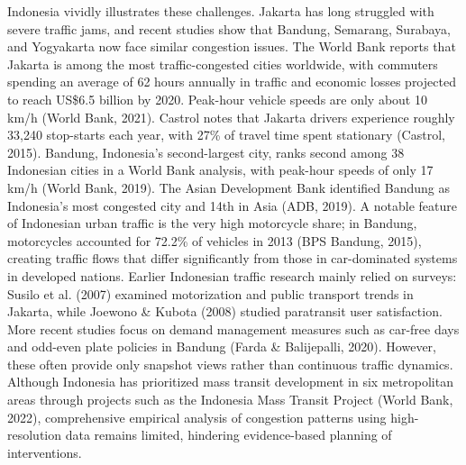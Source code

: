 \documentclass[12pt,a4paper]{article}
\begin{document}
Indonesia vividly illustrates these challenges. Jakarta has long struggled with severe traffic jams, and recent studies show that Bandung, Semarang, Surabaya, and Yogyakarta now face similar congestion issues. The World Bank reports that Jakarta is among the most traffic-congested cities worldwide, with commuters spending an average of 62 hours annually in traffic and economic losses projected to reach US\$6.5 billion by 2020. Peak-hour vehicle speeds are only about 10 km/h (World Bank, 2021). Castrol notes that Jakarta drivers experience roughly 33,240 stop-starts each year, with 27\% of travel time spent stationary (Castrol, 2015). Bandung, Indonesia's second-largest city, ranks second among 38 Indonesian cities in a World Bank analysis, with peak-hour speeds of only 17 km/h (World Bank, 2019). The Asian Development Bank identified Bandung as Indonesia's most congested city and 14th in Asia (ADB, 2019). A notable feature of Indonesian urban traffic is the very high motorcycle share; in Bandung, motorcycles accounted for 72.2\% of vehicles in 2013 (BPS Bandung, 2015), creating traffic flows that differ significantly from those in car-dominated systems in developed nations. Earlier Indonesian traffic research mainly relied on surveys: Susilo et al. (2007) examined motorization and public transport trends in Jakarta, while Joewono \& Kubota (2008) studied paratransit user satisfaction. More recent studies focus on demand management measures such as car-free days and odd-even plate policies in Bandung (Farda \& Balijepalli, 2020). However, these often provide only snapshot views rather than continuous traffic dynamics. Although Indonesia has prioritized mass transit development in six metropolitan areas through projects such as the Indonesia Mass Transit Project (World Bank, 2022), comprehensive empirical analysis of congestion patterns using high-resolution data remains limited, hindering evidence-based planning of interventions.
\end{document}
